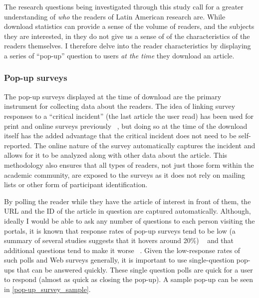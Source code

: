 The research questions being investigated through this study call for a greater understanding of \emph{who} the readers of Latin American research are. While download statistics can provide a sense of the volume of readers, and the subjects they are interested, in they do not give us a sense of of the characteristics of the readers themselves. I therefore delve into the reader characteristics by displaying a series of ``pop-up'' question to users \emph{at the time} they download an article.

\subsubsection{Pop-up surveys}
\label{pop-upsurveys}

The pop-up surveys displayed at the time of download are the primary instrument for collecting data about the readers. The idea of linking survey responses to a ``critical incident'' (the last article the user read) has been used for print and online surveys previously ~\citep{Tenopir2000,Tenopir2010}, but doing so at the time of the download itself has the added advantage that the critical incident does not need to be self-reported. The online nature of the survey automatically captures the incident and allows for it to be analyzed along with other data about the article. This methodology also ensures that all types of readers, not just those form within the academic community, are exposed to the surveys as it does not rely on mailing lists or other form of participant identification.

By polling the reader while they have the article of interest in front of them, the URL and the ID of the article in question are captured automatically. Although, ideally I would be able to ask any number of questions to each person visiting the portals, it is known that response rates of pop-up surveys tend to be low (a summary of several studies suggests that it hovers around 20\%) ~\citep{Couper2001} and that additional questions tend to make it worse ~\citep{Comley2000}. Given the low-response rates of such polls and Web surveys generally, it is important to use single-question pop-ups that can be answered quickly. These single question polls are quick for a user to respond (almost as quick as closing the pop-up). A sample pop-up can be seen in \autoref{pop-up_survey_sample}.

